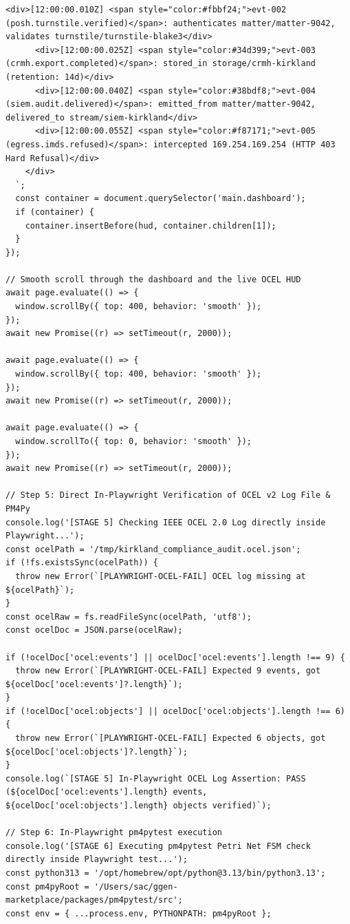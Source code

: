 \documentclass[10pt,twoside,openany]{book}
\theoremstyle{plain}
\theoremstyle{definition}
\theoremstyle{remark}
\begin{document}
\begin{lstlisting}[caption={scripts/run\_full\_process\_playwright.mjs}]
      <div>[12:00:00.010Z] <span style="color:#fbbf24;">evt-002 (posh.turnstile.verified)</span>: authenticates matter/matter-9042, validates turnstile/turnstile-blake3</div>
      <div>[12:00:00.025Z] <span style="color:#34d399;">evt-003 (crmh.export.completed)</span>: stored_in storage/crmh-kirkland (retention: 14d)</div>
      <div>[12:00:00.040Z] <span style="color:#38bdf8;">evt-004 (siem.audit.delivered)</span>: emitted_from matter/matter-9042, delivered_to stream/siem-kirkland</div>
      <div>[12:00:00.055Z] <span style="color:#f87171;">evt-005 (egress.imds.refused)</span>: intercepted 169.254.169.254 (HTTP 403 Hard Refusal)</div>
    </div>
  `;
  const container = document.querySelector('main.dashboard');
  if (container) {
    container.insertBefore(hud, container.children[1]);
  }
});

// Smooth scroll through the dashboard and the live OCEL HUD
await page.evaluate(() => {
  window.scrollBy({ top: 400, behavior: 'smooth' });
});
await new Promise((r) => setTimeout(r, 2000));

await page.evaluate(() => {
  window.scrollBy({ top: 400, behavior: 'smooth' });
});
await new Promise((r) => setTimeout(r, 2000));

await page.evaluate(() => {
  window.scrollTo({ top: 0, behavior: 'smooth' });
});
await new Promise((r) => setTimeout(r, 2000));

// Step 5: Direct In-Playwright Verification of OCEL v2 Log File & PM4Py
console.log('[STAGE 5] Checking IEEE OCEL 2.0 Log directly inside Playwright...');
const ocelPath = '/tmp/kirkland_compliance_audit.ocel.json';
if (!fs.existsSync(ocelPath)) {
  throw new Error(`[PLAYWRIGHT-OCEL-FAIL] OCEL log missing at ${ocelPath}`);
}
const ocelRaw = fs.readFileSync(ocelPath, 'utf8');
const ocelDoc = JSON.parse(ocelRaw);

if (!ocelDoc['ocel:events'] || ocelDoc['ocel:events'].length !== 9) {
  throw new Error(`[PLAYWRIGHT-OCEL-FAIL] Expected 9 events, got ${ocelDoc['ocel:events']?.length}`);
}
if (!ocelDoc['ocel:objects'] || ocelDoc['ocel:objects'].length !== 6) {
  throw new Error(`[PLAYWRIGHT-OCEL-FAIL] Expected 6 objects, got ${ocelDoc['ocel:objects']?.length}`);
}
console.log(`[STAGE 5] In-Playwright OCEL Log Assertion: PASS (${ocelDoc['ocel:events'].length} events, ${ocelDoc['ocel:objects'].length} objects verified)`);

// Step 6: In-Playwright pm4pytest execution
console.log('[STAGE 6] Executing pm4pytest Petri Net FSM check directly inside Playwright test...');
const python313 = '/opt/homebrew/opt/python@3.13/bin/python3.13';
const pm4pyRoot = '/Users/sac/ggen-marketplace/packages/pm4pytest/src';
const env = { ...process.env, PYTHONPATH: pm4pyRoot };


\end{lstlisting}
\end{document}
